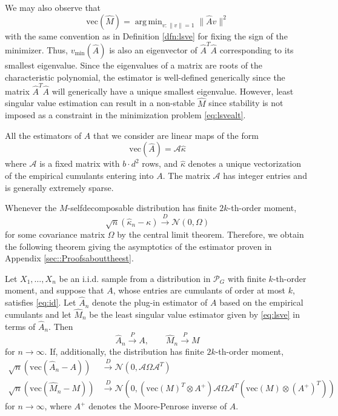 \documentclass{biometrika}
\DeclareMathOperator*{\argmin}{arg\,min}
\begin{document}
We may also observe that 
\begin{equation}
    \label{eq:lsvealt}
    \mathrm{vec}(\hat{M}) = \argmin_{v: \|v\| = 1}  \| \hat{A} v \|^2
\end{equation}
with the same convention as in Definition \ref{dfn:lsve} for fixing the sign of the minimizer.
Thus, $v_{\min}(\hat{A})$ is also an eigenvector of $\hat{A}^T \hat{A}$ corresponding to 
its smallest eigenvalue. Since the eigenvalues of a matrix are roots of the characteristic 
polynomial, the estimator is well-defined generically since the matrix $\hat{A}^T \hat{A}$ will generically have a unique smallest eigenvalue. However, least singular value 
estimation can result in a non-stable $\hat{M}$ since stability is not imposed as a 
constraint in the minimization problem \eqref{eq:lsvealt}.  

All the estimators of $A$ that we consider are linear maps of the form 
\begin{equation}
    \mathrm{vec}(\hat{A}) = \mathcal{A} \hat{\kappa}  
\end{equation}
where $\mathcal{A}$ is a fixed matrix with $b \cdot d^2$ rows, and $\hat{\kappa}$ denotes 
a unique vectorization of the empirical cumulants entering into $A$. The matrix 
$\mathcal{A}$ has integer entries and is generally extremely sparse.

Whenever the $M$-selfdecomposable distribution has finite $2k$-th-order moment, 
\begin{equation} \label{eq::AsymptoticNormalityCumulants}
    \sqrt{n}(\hat{\kappa}_n - \kappa) \xrightarrow{D} \mathcal{N} \left(0, \Omega \right)
\end{equation}
for some covariance matrix $\Omega$ by the central limit theorem. Therefore, we obtain the following theorem giving the asymptotics of the estimator proven in Appendix \ref{sec::Proofsabouttheest}. 

\begin{theorem} \label{thm::AsympoticsSingularValueEst}
Let $X_1, \ldots, X_n$ be an i.i.d. sample from a distribution in $\mathcal{P}_G$
with finite $k$-th-order moment, and suppose that $A$, whose entries are cumulants of order at most $k$, satisfies \eqref{eq:id}. Let $\hat{A}_n$ denote the plug-in estimator of $A$ based on the empirical cumulants and let $\hat{M}_n$ be the least singular value estimator 
given by \eqref{eq:lsve} in terms of $\hat{A}_n$. 
Then 
\begin{equation}
    \hat{A}_n \xrightarrow{P} A, \qquad \hat{M}_n \xrightarrow{P} M
\end{equation}
for $n \to \infty$. If, additionally, the distribution has finite $2k$-th-order moment, 
\begin{align*}
    \sqrt{n}(\mathrm{vec}(\hat{A}_n - A)) & \xrightarrow{D} \mathcal{N} \left(0, \mathcal{A} \Omega \mathcal{A}^T \right) \\
    \sqrt{n}(\mathrm{vec}(\hat{M}_n - M)) & \xrightarrow{D} \mathcal{N} 
    \left(0, \left(\mathrm{vec}(M)^T \otimes A^{+} \right) \mathcal{A} \Omega \mathcal{A}^T \left( \mathrm{vec}(M) \otimes (A^{+})^T\right) \right)
\end{align*}
for $n \to \infty$, where $A^{+}$ denotes the Moore-Penrose inverse of $A$.
\end{theorem}
\end{document}
